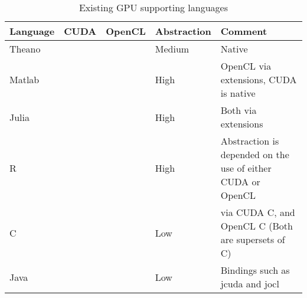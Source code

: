 \begin{table}
	\centering
	\begin{tabular}{|l|c|c|l|l|}
	\hline
	\textbf{Language} & \textbf{CUDA}         & \textbf{OpenCL} & \textbf{Abstraction} & \textbf{Comment}			  		\\ \hline
	Theano   & \cmark           & \cmark            & Medium      &  Native                                                          \\ \hline
	Matlab   & \cmark           & \cmark            & High        &  OpenCL via extensions, CUDA is native                                                         \\ \hline
	Julia    & \cmark           & \cmark            & High        &  Both via extensions                                                          \\ \hline
	R        & \cmark           & \cmark            & High    & Abstraction is depended on the use of either CUDA or OpenCL \\ \hline
	C   	 & \cmark           & \cmark            & Low         & via CUDA C, and OpenCL C (Both are supersets of C)                                           \\ \hline
	Java     & \cmark           & \cmark            & Low         & Bindings such as jcuda and jocl                                            \\ \hline
	\end{tabular}
	\caption{Existing GPU supporting languages}
	\label{tbl:sota}
\end{table}
               
